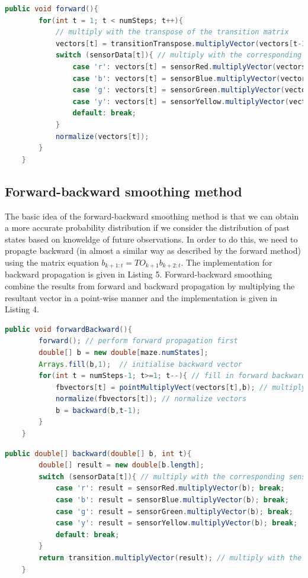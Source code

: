 \documentclass[9.5pt]{extarticle}
\begin{document}
\begin{lstlisting}[language=java,caption={forward}]
	public void forward(){
        for(int t = 1; t < numSteps; t++){
            // multiply with the transpose of the transition matrix
            vectors[t] = transitionTranspose.multiplyVector(vectors[t-1]);
            switch (sensorData[t]){ // multiply with the corresponding sensor matrix
                case 'r': vectors[t] = sensorRed.multiplyVector(vectors[t]); break;
                case 'b': vectors[t] = sensorBlue.multiplyVector(vectors[t]); break;
                case 'g': vectors[t] = sensorGreen.multiplyVector(vectors[t]); break;
                case 'y': vectors[t] = sensorYellow.multiplyVector(vectors[t]); break;
                default: break;
            }
            normalize(vectors[t]);
        }
    }
\end{lstlisting}

\subsection{Forward-backward smoothing method}

The basic idea of the forward-backward smoothing method is that we can obtain a more accurate probability distribution if we consider the distribution of past states based on knoweldge of future observations. In order to do this, we need to propagte backward (in almost a similar way as described by the forward method) using the matrix equation $b_{k+1:t} = TO_{k+1}b_{k+2:t}$. The implementation for backward propagation is given in Listing 5. Forward-backward smoothing combine the results from forward and backward propagation by multiplying the resultant vector in a point-wise manner and the implementation is given in Listing 4. 


\begin{lstlisting}[language=java,caption={forwardBackward}]
    public void forwardBackward(){
        forward(); // perform forward propagation first
        double[] b = new double[maze.numStates];
        Arrays.fill(b,1);  // initialise backward vector
        for(int t = numSteps-1; t>=1; t--){ // fill in forward backward vector
            fbvectors[t] = pointMultiplyVect(vectors[t],b); // multiply both vectors pointwise
            normalize(fbvectors[t]); // normalize vectors
            b = backward(b,t-1);
        }
    }
\end{lstlisting}

\begin{lstlisting}[language=java,caption={backward}]
    public double[] backward(double[] b, int t){
        double[] result = new double[b.length];
        switch (sensorData[t]){ // multiply with the corresponding sensor matrix
            case 'r': result = sensorRed.multiplyVector(b); break;
            case 'b': result = sensorBlue.multiplyVector(b); break;
            case 'g': result = sensorGreen.multiplyVector(b); break;
            case 'y': result = sensorYellow.multiplyVector(b); break;
            default: break;
        }
        return transition.multiplyVector(result); // multiply with the transition matrix
    }
\end{lstlisting}
\end{document}
